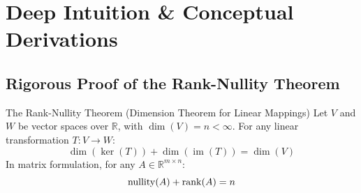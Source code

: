 \section{Deep Intuition \& Conceptual Derivations}

\subsection{Rigorous Proof of the Rank-Nullity Theorem}

\begin{theorembox}{The Rank-Nullity Theorem (Dimension Theorem for Linear Mappings)}
Let $V$ and $W$ be vector spaces over $\mathbb{R}$, with $\dim(V) = n < \infty$. For any linear transformation $T: V \to W$:
\begin{equation}
\dim(\ker(T)) + \dim(\operatorname{im}(T)) = \dim(V)
\end{equation}
In matrix formulation, for any $A \in \mathbb{R}^{m \times n}$:
\begin{equation}
\operatorname{nullity}(A) + \operatorname{rank}(A) = n
\end{equation}
\end{theorembox}

